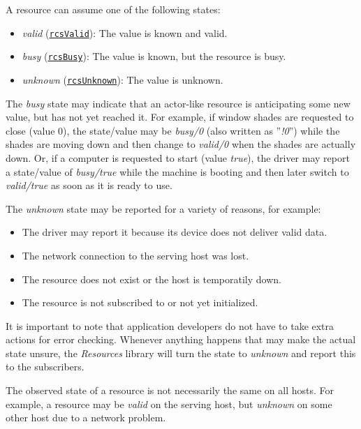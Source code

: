 \documentclass[12pt,english,parskip=half,headheight=19pt]{scrreprt}
\newcommand{\refapic}[1]{\href{home2l-api_c/index.html}{\mbox{\texttt{#1}}}}            %
\begin{document}
A resource can assume one of the following states:

\begin{itemize}
  \item \textit{valid} (\refapic{rcsValid}): The value is known and valid.
  \item \textit{busy} (\refapic{rcsBusy}): The value is known, but the resource is busy.
  \item \textit{unknown} (\refapic{rcsUnknown}): The value is unknown.
\end{itemize}

The \textit{busy} state may indicate that an actor-like resource is
anticipating some new value, but has not yet reached it. For example, if
window shades are requested to close (value 0), the state/value may be
\textit{busy/0} (also written as ''\textit{!0}'') while the shades are
moving down and then change to \textit{valid/0} when the shades are
actually down. Or, if a computer is requested to start (value \textit{true}),
the driver may report a state/value of \textit{busy/true} while
the machine is booting and then later switch to \textit{valid/true} as soon as
it is ready to use.

The \textit{unknown} state may be reported for a variety of reasons, for example:
\begin{itemize}
  \item The driver may report it because its device does not deliver valid data.
  \item The network connection to the serving host was lost.
  \item The resource does not exist or the host is temporatily down.
  \item The resource is not subscribed to or not yet initialized.
\end{itemize}

It is important to note that application developers do not have to take
extra actions for error checking. Whenever anything happens that may
make the actual state unsure, the \textit{Resources} library will turn the
state to \textit{unknown} and report this to the subscribers.

The observed state of a resource is not necessarily the same on all hosts. For example, a resource
may be \textit{valid} on the serving host, but \textit{unknown} on some other host due to
a network problem.





\end{document}

